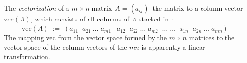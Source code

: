 \documentclass[12pt]{article}
\theoremstyle{definition}
\begin{document}
The {\em vectorization} of a $m\!\times\!n$ matrix \,$A = (a_{ij})$\,  the matrix to a column vector $\mbox{vec}(A)$, which consists of all columns of $A$ stacked in : 
$$\mbox{vec}(A) \;:=\; \left(a_{11}\;\;a_{21}\;\ldots\;a_{m1}\;\;\;a_{12}\;\;a_{22}\;\ldots\;a_{m2}\;\;
\ldots\;\ldots\;\;a_{1n}\;\;a_{2n}\;\ldots\;a_{mn}\right)^\intercal$$
The mapping vec from the vector space formed by the $m\!\times\!n$ matrices to the vector space of the column vectors of the  $mn$ is apparently a linear transformation.

\end{document}
